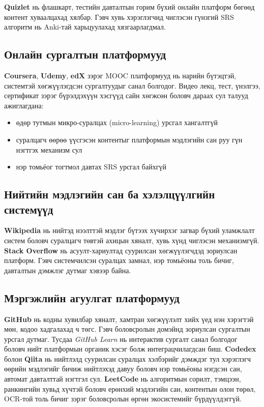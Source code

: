 \textbf{Quizlet} нь флашкарт, тестийн давталтын горим бүхий онлайн платформ бөгөөд контент хуваалцахад хялбар. Гэвч хувь хэрэглэгчид чиглэсэн гүнзгий SRS алгоритм нь Anki-тай харьцуулахад хязгаарлагдмал.

\subsection{Онлайн сургалтын платформууд}

\textbf{Coursera}, \textbf{Udemy}, \textbf{edX} зэрэг MOOC платформууд нь нарийн бүтэцтэй, системтэй хөгжүүлэгдсэн сургалтуудыг санал болгодог. Видео лекц, тест, үнэлгээ, сертификат зэрэг бүрэлдэхүүн хэсгүүд сайн хөгжсөн боловч дараах сул талууд ажиглагдана:

\begin{itemize}[leftmargin=2em, itemsep=0.2em]
    \item өдөр тутмын микро-суралцах (micro-learning) урсгал хангалтгүй
    \item суралцагч өөрөө үүсгэсэн контентыг платформын мэдлэгийн сан руу гүн нэгтгэх механизм сул
    \item нэр томьёог тогтмол давтах SRS урсгал байхгүй
\end{itemize}

\subsection{Нийтийн мэдлэгийн сан ба хэлэлцүүлгийн системүүд}

\textbf{Wikipedia} нь нийтэд нээлттэй мэдлэг бүтээх хүчирхэг загвар бүхий уламжлалт систем боловч суралцагч төвтэй ахицын хяналт, хувь хүнд чиглэсэн механизмгүй. \textbf{Stack Overflow} нь асуулт-хариултад суурилсан хөгжүүлэгчдэд зориулсан платформ. Гэвч системчилсэн суралцах замнал, нэр томьёоны толь бичиг, давталтын дэмжлэг дутмаг хэвээр байна.

\subsection{Мэргэжлийн агуулгат платформууд}

\textbf{GitHub} нь кодны хувилбар хяналт, хамтран хөгжүүлэлт хийх үед нэн хэрэгтэй мөн, кодоо хадгалахад ч төгс. Гэвч  боловсролын домэйнд зориулсан сургалтын урсгал дутмаг. Тусдаа \textit{GitHub Learn} нь интерактив сургалт санал болгодог боловч нийт платформын органик хэсэг болж интеграцчилагдсан биш. \textbf{Codedex} болон \textbf{Qiita} нь нийтлэлд суурилсан суралцах хэлбэрийг дэмждэг тул хэрэглэгч өөрийн мэдлэгийг бичиж нийтлэхэд давуу боловч нэр томьёоны нэгдсэн сан, автомат давталттай нэгтгэл сул. \textbf{LeetCode} нь алгоритмын сорилт, тэмцээн, ранкингийн хувьд хүчтэй боловч ерөнхий мэдлэгийн сан, контентын олон төрөл, OCR-той толь бичиг зэрэг боловсролын өргөн экосистемийг бүрдүүлдэггүй.


